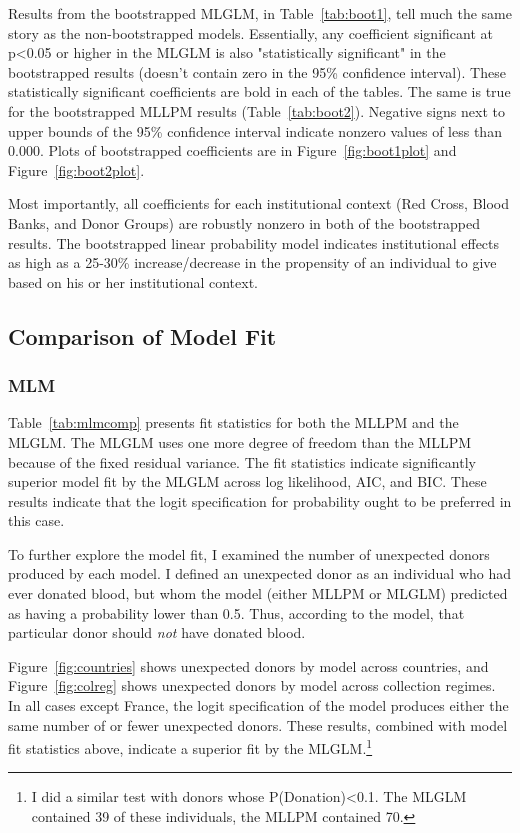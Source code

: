 \documentclass[11pt,article,oneside]{memoir}
\begin{document}
Results from the bootstrapped MLGLM, in Table~\ref{tab:boot1}, tell much the same story as the non-bootstrapped models. Essentially, any coefficient significant at p<0.05 or higher in the MLGLM is also "statistically significant" in the bootstrapped results (doesn't contain zero in the 95\% confidence interval). These statistically significant coefficients are bold in each of the tables. The same is true for the bootstrapped MLLPM results (Table~\ref{tab:boot2}). Negative signs next to upper bounds of the 95\% confidence interval indicate nonzero values of less than 0.000. Plots of bootstrapped coefficients are in Figure~\ref{fig:boot1plot} and Figure~\ref{fig:boot2plot}.

Most importantly, all coefficients for each institutional context (Red Cross, Blood Banks, and Donor Groups) are robustly nonzero in both of the bootstrapped results. The bootstrapped linear probability model indicates institutional effects as high as a 25-30\% increase/decrease in the propensity of an individual to give based on his or her institutional context.

\subsection{Comparison of Model Fit}


\subsubsection{MLM}

Table~\ref{tab:mlmcomp} presents fit statistics for both the MLLPM and the MLGLM. The MLGLM uses one more degree of freedom than the MLLPM because of the fixed residual variance. The fit statistics indicate significantly superior model fit by the MLGLM across log likelihood, AIC, and BIC. These results indicate that the logit specification for probability ought to be preferred in this case.

To further explore the model fit, I examined the number of unexpected donors produced by each model. I defined an unexpected donor as an individual who had ever donated blood, but whom the model (either MLLPM or MLGLM) predicted as having a probability lower than 0.5. Thus, according to the model, that particular donor should \emph{not} have donated blood.

Figure~\ref{fig:countries} shows unexpected donors by model across countries, and Figure~\ref{fig:colreg} shows unexpected donors by model across collection regimes. In all cases except France, the logit specification of the model produces either the same number of or fewer unexpected donors. These results, combined with model fit statistics above, indicate a superior fit by the MLGLM.\footnote{I did a similar test with donors whose P(Donation)<0.1. The MLGLM contained 39 of these individuals, the MLLPM contained 70.}
\end{document}
